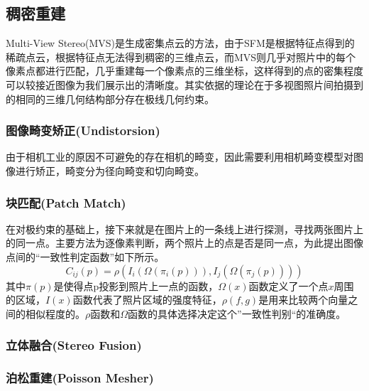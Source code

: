 \documentclass[10pt]{article}
\begin{document}
\subsection{稠密重建}
Multi-View Stereo(MVS)是生成密集点云的方法，由于SFM是根据特征点得到的稀疏点云，根据特征点无法得到稠密的三维点云，而MVS则几乎对照片中的每个像素点都进行匹配，几乎重建每一个像素点的三维坐标，这样得到的点的密集程度可以较接近图像为我们展示出的清晰度。其实依据的理论在于多视图照片间拍摄到的相同的三维几何结构部分存在极线几何约束。
\subsubsection{图像畸变矫正(Undistorsion)}
由于相机工业的原因不可避免的存在相机的畸变，因此需要利用相机畸变模型对图像进行矫正，畸变分为径向畸变和切向畸变。
\subsubsection{块匹配(Patch Match)}
在对极约束的基础上，接下来就是在图片上的一条线上进行探测，寻找两张图片上的同一点。主要方法为逐像素判断，两个照片上的点是否是同一点，为此提出图像点间的“一致性判定函数”如下所示。
\begin{equation}
C_{ij}(p)=\rho(I_i(\Omega(\pi_i(p))),I_j(\Omega(\pi_j(p))))
\end{equation}
其中$\pi(p)$是使得点p投影到照片上一点的函数，$\Omega(x)$函数定义了一个点$x$周围的区域，$I(x)$函数代表了照片区域的强度特征，$\rho(f,g)$是用来比较两个向量之间的相似程度的。$\rho$函数和$\Omega$函数的具体选择决定这个”一致性判别“的准确度。

\subsubsection{立体融合(Stereo Fusion)}
\subsubsection{泊松重建(Poisson Mesher)}
\end{document}
